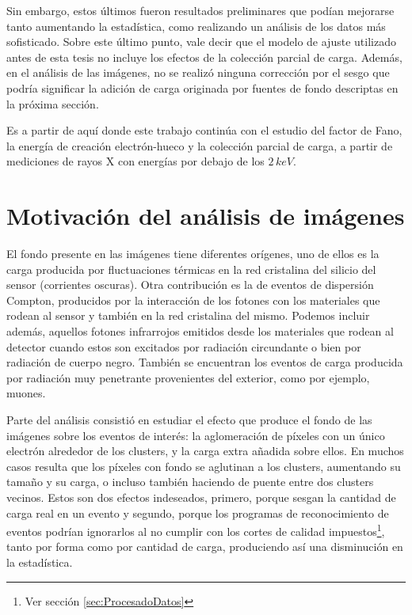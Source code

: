 Sin embargo, estos últimos fueron resultados preliminares que podían mejorarse tanto aumentando la estadística, como realizando un análisis de los datos más sofisticado. Sobre este último punto, vale decir que el modelo de ajuste utilizado antes de esta tesis no incluye los efectos de la colección parcial de carga. Además, en el análisis de las imágenes, no se realizó ninguna corrección por el sesgo que podría significar la adición de carga originada por fuentes de fondo descriptas en la próxima sección.

Es a partir de aquí donde este trabajo continúa con el estudio del factor de Fano, la energía de creación electrón-hueco y la colección parcial de carga, a partir de mediciones de rayos X con energías por debajo de los $2\,\si{keV}$.

\section{Motivación del análisis de imágenes}
\noindent El fondo presente en las imágenes tiene diferentes orígenes, uno de ellos es la carga producida por fluctuaciones térmicas en la red cristalina del silicio del sensor (corrientes oscuras). Otra contribución es la de eventos de dispersión Compton, producidos por la interacción de los fotones con los materiales que rodean al sensor y también en la red cristalina del mismo. Podemos incluir además, aquellos fotones infrarrojos emitidos desde los materiales que rodean al detector cuando estos son excitados por radiación circundante o bien por radiación de cuerpo negro. También se encuentran los eventos de carga producida por radiación muy penetrante provenientes del exterior, como por ejemplo, muones.

Parte del análisis consistió en estudiar el efecto que produce el fondo de las imágenes sobre los eventos de interés: la aglomeración de píxeles con un único electrón alrededor de los clusters, y la carga extra añadida sobre ellos. 
En muchos casos resulta que los píxeles con fondo se aglutinan a los clusters, aumentando su tamaño y su carga, o incluso también haciendo de puente entre dos clusters vecinos. Estos son dos efectos indeseados, primero, porque sesgan la cantidad de carga real en un evento y segundo, porque los programas de reconocimiento de eventos podrían ignorarlos al no cumplir con los cortes de calidad impuestos\footnote{Ver sección \ref{sec:ProcesadoDatos}}, tanto por forma como por cantidad de carga, produciendo así una disminución en la estadística.

